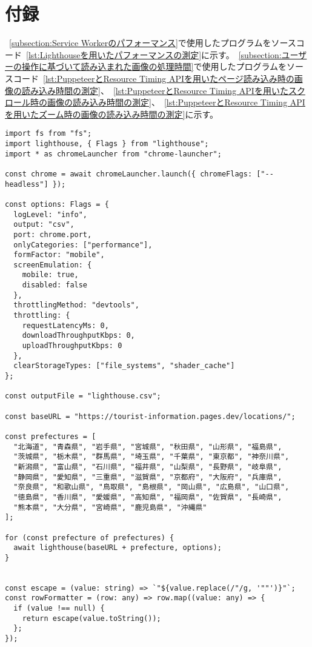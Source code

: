 \section*{付録}
~\autoref{subsection:Service Workerのパフォーマンス}で使用したプログラムをソースコード~\ref{lst:Lighthouseを用いたパフォーマンスの測定}に示す。~\autoref{subsection:ユーザーの操作に基づいて読み込まれた画像の処理時間}で使用したプログラムをソースコード~\ref{lst:PuppeteerとResource Timing APIを用いたページ読み込み時の画像の読み込み時間の測定}、~\ref{lst:PuppeteerとResource Timing APIを用いたスクロール時の画像の読み込み時間の測定}、~\ref{lst:PuppeteerとResource Timing APIを用いたズーム時の画像の読み込み時間の測定}に示す。

\begin{lstlisting}[caption={Lighthouseを用いたパフォーマンスの測定},label={lst:Lighthouseを用いたパフォーマンスの測定}]
import fs from "fs";
import lighthouse, { Flags } from "lighthouse";
import * as chromeLauncher from "chrome-launcher";

const chrome = await chromeLauncher.launch({ chromeFlags: ["--headless"] });

const options: Flags = {
  logLevel: "info",
  output: "csv",
  port: chrome.port,
  onlyCategories: ["performance"],
  formFactor: "mobile",
  screenEmulation: {
    mobile: true,
    disabled: false
  },
  throttlingMethod: "devtools",
  throttling: {
    requestLatencyMs: 0,
    downloadThroughputKbps: 0,
    uploadThroughputKbps: 0
  },
  clearStorageTypes: ["file_systems", "shader_cache"]
};

const outputFile = "lighthouse.csv";

const baseURL = "https://tourist-information.pages.dev/locations/";

const prefectures = [
  "北海道", "青森県", "岩手県", "宮城県", "秋田県", "山形県", "福島県",
  "茨城県", "栃木県", "群馬県", "埼玉県", "千葉県", "東京都", "神奈川県",
  "新潟県", "富山県", "石川県", "福井県", "山梨県", "長野県", "岐阜県",
  "静岡県", "愛知県", "三重県", "滋賀県", "京都府", "大阪府", "兵庫県",
  "奈良県", "和歌山県", "鳥取県", "島根県", "岡山県", "広島県", "山口県",
  "徳島県", "香川県", "愛媛県", "高知県", "福岡県", "佐賀県", "長崎県",
  "熊本県", "大分県", "宮崎県", "鹿児島県", "沖縄県"
];

for (const prefecture of prefectures) {
  await lighthouse(baseURL + prefecture, options);
}


const escape = (value: string) => `"${value.replace(/"/g, '""')}"`;
const rowFormatter = (row: any) => row.map((value: any) => {
  if (value !== null) {
    return escape(value.toString());
  };
});


\end{lstlisting}
